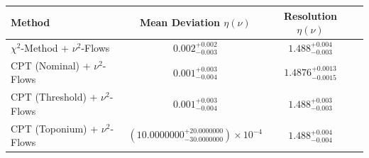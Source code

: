     \begin{tabular}{lccc}
        \toprule
        Method & Mean Deviation $\eta({\nu})$ & Resolution $\eta({\nu})$ \\
        \midrule
        $\chi^2$-Method + $\nu^2$-Flows & $0.002^{+0.002}_{-0.003}$ & $1.488^{+0.004}_{-0.003}$ \\
        CPT (Nominal) + $\nu^2$-Flows & $0.001^{+0.003}_{-0.004}$ & $1.4876^{+0.0013}_{-0.0015}$ \\
        CPT (Threshold) + $\nu^2$-Flows & $0.001^{+0.003}_{-0.004}$ & $1.488^{+0.003}_{-0.003}$ \\
        CPT (Toponium) + $\nu^2$-Flows & $(10.0000000^{+20.0000000}_{-30.0000000})\times 10^{-4}$ & $1.488^{+0.004}_{-0.004}$ \\
        \bottomrule
    \end{tabular}